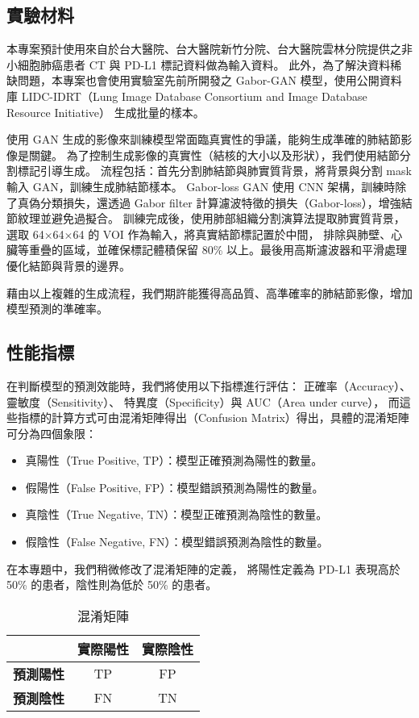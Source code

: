 \documentclass[12pt,a4paper]{article}
\begin{document}
\subsection{實驗材料}

本專案預計使用來自於台大醫院、台大醫院新竹分院、台大醫院雲林分院提供之非小細胞肺癌患者 CT 與 PD-L1 標記資料做為輸入資料。
此外，為了解決資料稀缺問題，本專案也會使用實驗室先前所開發之 Gabor-GAN 模型，使用公開資料庫
LIDC-IDRT（Lung Image Database Consortium and Image Database Resource Initiative） 生成批量的樣本。

使用 GAN 生成的影像來訓練模型常面臨真實性的爭議，能夠生成準確的肺結節影像是關鍵。
為了控制生成影像的真實性（結核的大小以及形狀），我們使用結節分割標記引導生成。
流程包括：首先分割肺結節與肺實質背景，將背景與分割 mask 輸入 GAN，訓練生成肺結節樣本。
Gabor-loss GAN 使用 CNN 架構，訓練時除了真偽分類損失，還透過 Gabor filter 計算濾波特徵的損失（Gabor-loss），增強結節紋理並避免過擬合。
訓練完成後，使用肺部組織分割演算法提取肺實質背景，選取 64$\times$64$\times$64 的 VOI 作為輸入，將真實結節標記置於中間，
排除與肺壁、心臟等重疊的區域，並確保標記體積保留 80\% 以上。最後用高斯濾波器和平滑處理優化結節與背景的邊界。

藉由以上複雜的生成流程，我們期許能獲得高品質、高準確率的肺結節影像，增加模型預測的準確率。

\subsection{性能指標}

在判斷模型的預測效能時，我們將使用以下指標進行評估：
正確率（Accuracy）、靈敏度（Sensitivity）、  特異度（Specificity）與 AUC（Area under curve），
而這些指標的計算方式可由混淆矩陣得出（Confusion Matrix）得出，具體的混淆矩陣可分為四個象限：
\begin{itemize}
    \item 真陽性（True Positive, TP）：模型正確預測為陽性的數量。
    \item 假陽性（False Positive, FP）：模型錯誤預測為陽性的數量。
    \item 真陰性（True Negative, TN）：模型正確預測為陰性的數量。
    \item 假陰性（False Negative, FN）：模型錯誤預測為陰性的數量。
\end{itemize}

在本專題中，我們稍微修改了混淆矩陣的定義，
將陽性定義為 PD-L1 表現高於 50\% 的患者，陰性則為低於 50\% 的患者。

\begin{table}[h]
\centering
\begin{tabular}{|c|c|c|}
\hline
 & \textbf{實際陽性} & \textbf{實際陰性} \\ \hline
\textbf{預測陽性} & TP & FP \\ \hline
\textbf{預測陰性} & FN & TN \\ \hline
\end{tabular}
\caption{混淆矩陣}
\end{table}
\end{document}
